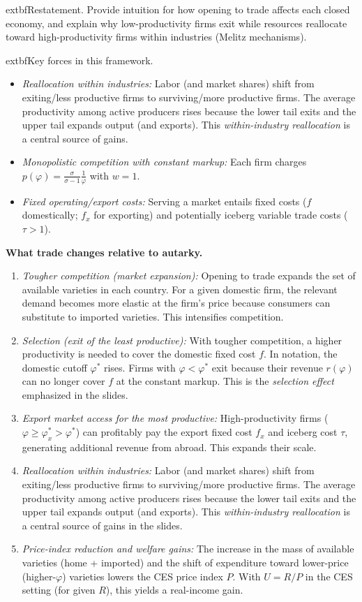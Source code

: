 \begin{solution}
		extbf{Restatement.} Provide intuition for how opening to trade affects each closed economy, and explain why low-productivity firms exit while resources reallocate toward high-productivity firms within industries (Melitz mechanisms).

\bigskip
		extbf{Key forces in this framework.}
\begin{itemize}
	\item \emph{Reallocation within industries:} Labor (and market shares) shift from exiting/less productive firms to surviving/more productive firms. The average productivity among active producers rises because the lower tail exits and the upper tail expands output (and exports). This \emph{within-industry reallocation} is a central source of gains.
	\item \emph{Monopolistic competition with constant markup:} Each firm charges $p(\varphi)=\tfrac{\sigma}{\sigma-1}\tfrac{1}{\varphi}$ with $w=1$.
	\item \emph{Fixed operating/export costs:} Serving a market entails fixed costs ($f$ domestically; $f_x$ for exporting) and potentially iceberg variable trade costs ($\tau>1$).
\end{itemize}

\bigskip
	\textbf{What trade changes relative to autarky.}
\begin{enumerate}
	\item \emph{Tougher competition (market expansion):} Opening to trade expands the set of available varieties in each country. For a given domestic firm, the relevant demand becomes more elastic at the firm’s price because consumers can substitute to imported varieties. This intensifies competition.
	\item \emph{Selection (exit of the least productive):} With tougher competition, a higher productivity is needed to cover the domestic fixed cost $f$. In notation, the domestic cutoff $\varphi^*$ rises. Firms with $\varphi<\varphi^*$ exit because their revenue $r(\varphi)$ can no longer cover $f$ at the constant markup. This is the \emph{selection effect} emphasized in the slides.
	\item \emph{Export market access for the most productive:} High-productivity firms ($\varphi\ge \varphi_x^*>\varphi^*$) can profitably pay the export fixed cost $f_x$ and iceberg cost $\tau$, generating additional revenue from abroad. This expands their scale.
	\item \emph{Reallocation within industries:} Labor (and market shares) shift from exiting/less productive firms to surviving/more productive firms. The average productivity among active producers rises because the lower tail exits and the upper tail expands output (and exports). This \emph{within-industry reallocation} is a central source of gains in the slides.
	\item \emph{Price-index reduction and welfare gains:} The increase in the mass of available varieties (home + imported) and the shift of expenditure toward lower-price (higher-$\varphi$) varieties lowers the CES price index $P$. With $U=R/P$ in the CES setting (for given $R$), this yields a real-income gain.
\end{enumerate}


\end{solution}
